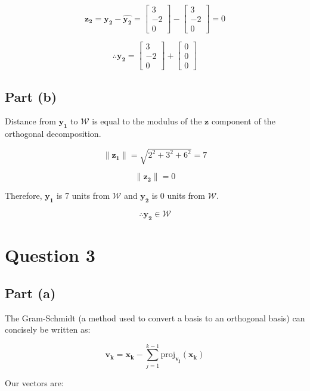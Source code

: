 \documentclass{article}
\begin{document}
\[%
    \mathbf{z_2}
    =
    \mathbf{y_2}-\mathbf{\hat{y_2}}
    =
    \begin{bmatrix}3\\-2\\0\end{bmatrix}
    -
    \begin{bmatrix}3\\-2\\0\end{bmatrix}
    =
    0
\]%

\[%
     \therefore \mathbf{y_2} = 
     \begin{bmatrix}3\\-2\\0\end{bmatrix}
     +
     \begin{bmatrix}0\\0\\0\end{bmatrix}
\]%

\subsection{Part (b)} 
Distance from $\mathbf{y_1}$ to $\mathcal{W}$ is equal to the modulus of the $\mathbf{z}$
component of the orthogonal decomposition.

 

\[%
    \|\mathbf{z_1}\|
    =
    \sqrt{2^{2}+3^{2}+6^{2}}
    =
    7
\]%

\[%
    \|\mathbf{z_2}\|
    =
    0
\]%

Therefore, $\mathbf{y_1}$ is 7 units from $\mathcal{W}$ and $\mathbf{y_2}$ is 0
units from $\mathcal{W}$. 

\[%
     \therefore \mathbf{y_2}
     \in 
     \mathcal{W}
\]%


\clearpage
\section{Question 3} 
\subsection{Part (a)} 
The Gram-Schmidt (a method used to convert a basis to an orthogonal basis) can concisely be written as:

\[%
    \mathbf{v_k}
    =
    \mathbf{x_k}
    -
    \sum_{j=1}^{k-1} \text{proj}_{\mathbf{v_j}}\left(\mathbf{x_k}\right)
\]%

Our vectors are:
\end{document}
